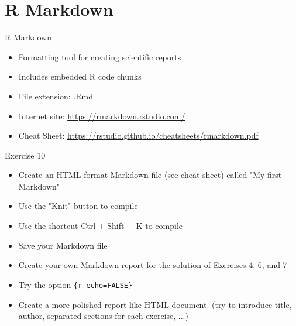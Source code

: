 \documentclass[aspectratio=169]{beamer}
\begin{document}
    


\section{\Large R Markdown}

\begin{frame}{R Markdown}
\begin{itemize}
    \item Formatting tool for creating scientific reports
    \item Includes embedded R code chunks
    \item File extension: .Rmd
    \item Internet site: \url{https://rmarkdown.rstudio.com/}
    \item Cheat Sheet: \url{https://rstudio.github.io/cheatsheets/rmarkdown.pdf}
\end{itemize}
\end{frame}

\begin{frame}{Exercise 10}
\begin{itemize}
    \item Create an HTML format Markdown file (see cheat sheet) called "My first Markdown"
    \item Use the "Knit" button to compile
    \item Use the shortcut Ctrl + Shift + K to compile
    \item Save your Markdown file
    \item Create your own Markdown report for the solution of Exercises 4, 6, and 7
    \item Try the option \texttt{\{r echo=FALSE\}}
    \item Create a more polished report-like HTML document. (try to introduce title, author, separated sections for each exercise, ...)
\end{itemize}
\end{frame}

\end{document}
